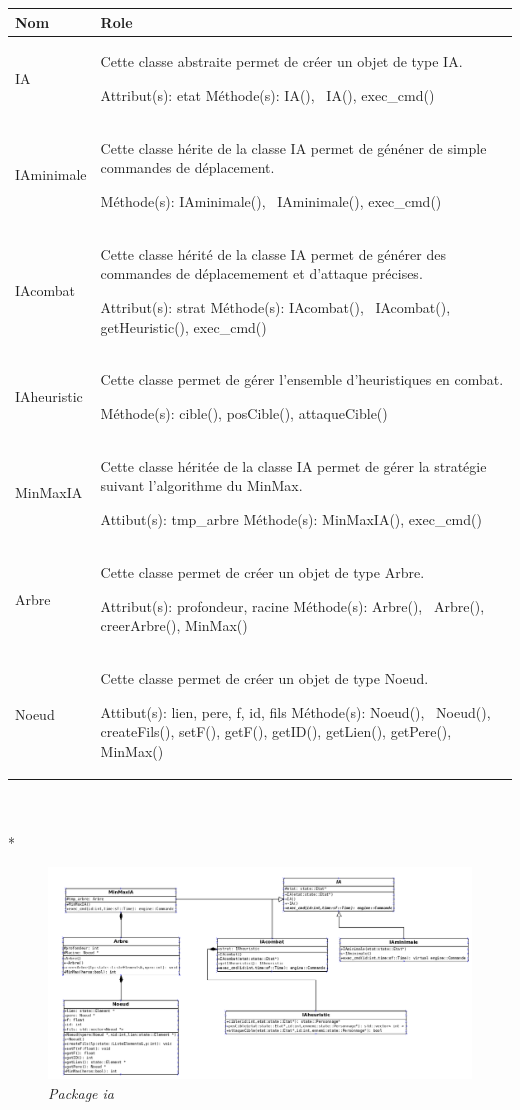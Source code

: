 \documentclass[11pt, a4paper]{article}
\begin{document}
\begin{tabularx}{\textwidth}{ |l|X| }
\hline
   \textbf{Nom} & \textbf{Role}
 \\
\hline

   IA & Cette classe abstraite permet de créer un objet de type IA.
   
Attribut(s): etat
\newline
Méthode(s): IA(), ~IA(), exec\_cmd()
 \\
\hline

    IAminimale & Cette classe hérite de la classe IA permet de généner de simple commandes de déplacement.

Méthode(s): IAminimale(), ~IAminimale(), exec\_cmd()
  \\
\hline

    IAcombat & Cette classe hérité de la classe IA permet de générer des commandes de déplacemement et d'attaque précises.
    
Attribut(s): strat
\newline
Méthode(s): IAcombat(), ~IAcombat(), getHeuristic(), exec\_cmd()
  \\
\hline

    IAheuristic & Cette classe permet de gérer l'ensemble d'heuristiques en combat.

Méthode(s): cible(), posCible(), attaqueCible()
  \\
\hline

    MinMaxIA & Cette classe héritée de la classe IA permet de gérer la stratégie suivant l'algorithme du MinMax.

Attibut(s): tmp\_arbre
\newline
Méthode(s): MinMaxIA(), exec\_cmd()
  \\
\hline

    Arbre & Cette classe permet de créer un objet de type Arbre.
    
Attribut(s): profondeur, racine
\newline
Méthode(s): Arbre(), ~Arbre(), creerArbre(), MinMax()
  \\
\hline

    Noeud & Cette classe permet de créer un objet de type Noeud.
    
Attibut(s): lien, pere, f, id, fils
\newline
Méthode(s): Noeud(), ~Noeud(), createFils(), setF(), getF(), getID(), getLien(), getPere(), MinMax()
  \\
\hline

\end{tabularx}\\ \\*

\begin{figure}[H]
  \centering
  \includegraphics[scale=0.45]{img/ia.png}
  \caption{\emph{Package ia}}
\end{figure}
\end{document}
